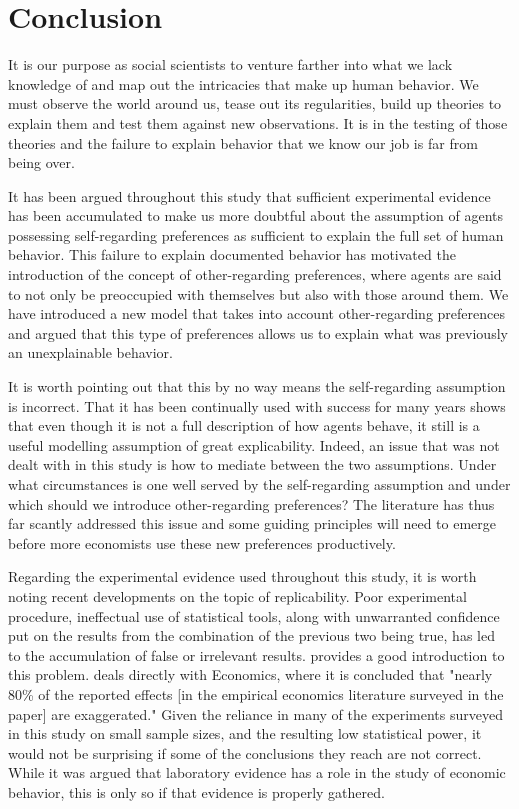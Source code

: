 \documentclass[12pt]{article}
\begin{document}
\section{Conclusion}

It is our purpose as social scientists to venture farther into what we lack knowledge of and map out the intricacies that make up human behavior. We must observe the world around us, tease out its regularities, build up theories to explain them and test them against new observations. It is in the testing of those theories and the failure to explain behavior that we know our job is far from being over.

It has been argued throughout this study that sufficient experimental evidence has been accumulated to make us more doubtful about the assumption of agents possessing self-regarding preferences as sufficient to explain the full set of human behavior. This failure to explain documented behavior has motivated the introduction of the concept of other-regarding preferences, where agents are said to not only be preoccupied with themselves but also with those around them. We have introduced a new model that takes into account other-regarding preferences and argued that this type of preferences allows us to explain what was previously an unexplainable behavior.

It is worth pointing out that this by no way means the self-regarding assumption is incorrect. That it has been continually used with success for many years shows that even though it is not a full description of how agents behave, it still is a useful modelling assumption of great explicability. Indeed, an issue that was not dealt with in this study is how to mediate between the two assumptions. Under what circumstances is one well served by the self-regarding assumption and under which should we introduce other-regarding preferences? The literature has thus far scantly addressed this issue and some guiding principles will need to emerge before more economists use these new preferences productively.

Regarding the experimental evidence used throughout this study, it is worth noting recent developments on the topic of replicability. Poor experimental procedure, ineffectual use of statistical tools, along with unwarranted confidence put on the results from the combination of the previous two being true, has led to the accumulation of false or irrelevant results. \cite{ioannidis2005most} provides a good introduction to this problem. \cite{ioannidis2017power} deals directly with Economics, where it is concluded that "nearly 80\% of the reported effects [in the empirical economics literature surveyed in the paper] are exaggerated." Given the reliance in many of the experiments surveyed in this study on small sample sizes, and the resulting low statistical power, it would not be surprising if some of the conclusions they reach are not correct. While it was argued that laboratory evidence has a role in the study of economic behavior, this is only so if that evidence is properly gathered. 
\end{document}
